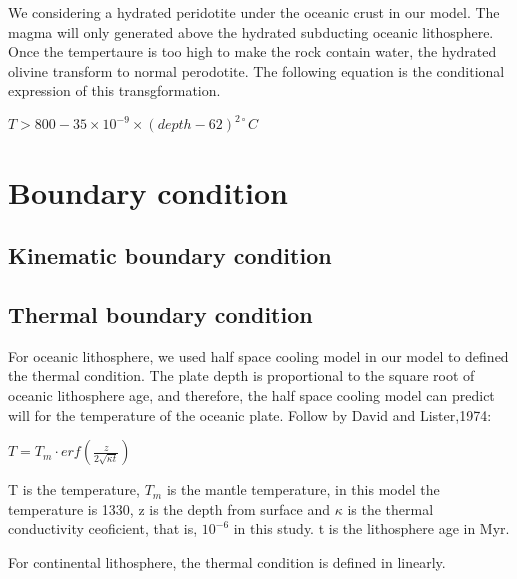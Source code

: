 We considering a hydrated peridotite under the oceanic crust in our model. 
The magma will only generated above the hydrated subducting oceanic lithosphere.
Once the tempertaure is too high to make the rock contain water, the hydrated olivine transform to normal perodotite.
The following equation is the conditional expression of this transgformation.

$T > 800-35\times 10^{-9}\times (depth-62)^{2\circ}C$

\section{Boundary condition}

\subsection{Kinematic boundary condition}

\subsection{Thermal boundary condition}

For oceanic lithosphere, we used half space cooling model in our model to defined the thermal condition. 
The plate depth is proportional to the square root of oceanic lithosphere age, and therefore, the half space cooling model can predict will for the temperature of the oceanic plate.
Follow by David and Lister,1974:

$T=T_m\cdot erf(\frac{z}{2\sqrt{\kappa t}})$

T is the temperature, $T_m$ is the mantle temperature, in this model the temperature is 1330,
z is the depth from surface and $\kappa$ is the thermal conductivity ceoficient, that is, $10^{-6}$ in this study.
t is the lithosphere age in Myr.


For continental lithosphere, the thermal condition is defined in linearly.


